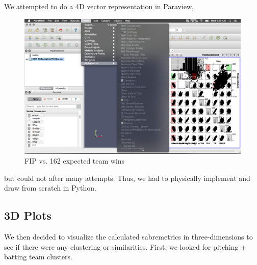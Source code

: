 \documentclass[12pt]{article}
\numberwithin{equation}{subsection}
\begin{document}
We attempted to do a 4D vector representation in Paraview, 
\begin{figure}[H]
    \centering
    \includegraphics[width=0.5\linewidth]{no4d} 
    \caption{FIP vs. 162 expected team wins} 
\end{figure}

but could not after many attempts. Thus, we had to physically implement and draw from scratch in Python.

\subsection{3D Plots}
We then decided to visualize the calculated sabremetrics in three-dimensions to see if there were any clustering or similarities. First, we looked for pitching + batting team clusters.
\end{document}

